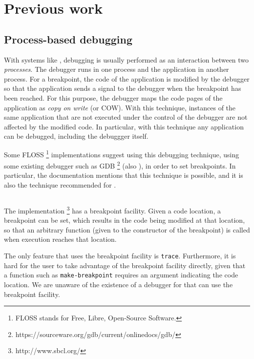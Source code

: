 \section{Previous work}

\subsection{Process-based debugging}

With systems like \unix{}, debugging is usually performed as an
interaction between two \emph{processes}.  The debugger runs in one
process and the application in another process.  For a breakpoint, the
code of the application is modified by the debugger so that the
application sends a signal to the debugger when the breakpoint has
been reached.  For this purpose, the debugger maps the code pages of
the application as \emph{copy on write} (or COW).  With this
technique, instances of the same application that are not executed
under the control of the debugger are not affected by the modified
code.  In particular, with this technique any application can be
debugged, including the debuggger itself.

Some FLOSS%
\footnote{FLOSS stands for Free, Libre, Open-Source Software.}
\commonlisp{} implementations suggest using this debugging technique,
using some existing debugger such as GDB%
\footnote{https://sourceware.org/gdb/current/onlinedocs/gdb/}
(also \cite{Stallman:gdb}), in order
to set breakpoints.  In particular, the \ccl{}
 documentation mentions that this technique
is possible, and it is also the technique recommended for \ecl{}
.

\subsection{\sbcl{}}

The \sbcl{} \commonlisp{} implementation%
\footnote{http://www.sbcl.org/}
has a breakpoint facility.  Given a code location, a breakpoint can be
set, which results in the code being modified at that location, so
that an arbitrary function (given to the constructor of the
breakpoint) is called when execution reaches that location.

The only feature that uses the breakpoint facility is \texttt{trace}.
Furthermore, it is hard for the user to take advantage of the
breakpoint facility directly, given that a function such as
\texttt{make-breakpoint} requires an argument indicating the code
location.  We are unaware of the existence of a debugger for \sbcl{}
that can use the breakpoint facility.

